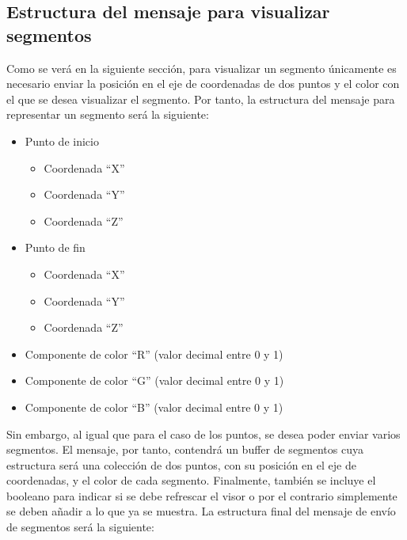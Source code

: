 \subsection{Estructura del mensaje para visualizar segmentos}
Como se verá en la siguiente sección, para visualizar un segmento únicamente es necesario enviar la posición en el eje de coordenadas de dos puntos y el color con el que se desea visualizar el segmento. Por tanto, la estructura del mensaje para representar un segmento será la siguiente:
\begin{itemize}
\item Punto de inicio
	\begin{itemize}
		\item Coordenada ``X''
		\item Coordenada ``Y''
		\item Coordenada ``Z''
	\end{itemize}
\item Punto de fin
	\begin{itemize}
		\item Coordenada ``X''
		\item Coordenada ``Y''
		\item Coordenada ``Z''
	\end{itemize}
\item Componente de color ``R'' (valor decimal entre 0 y 1)
\item Componente de color ``G'' (valor decimal entre 0 y 1)
\item Componente de color ``B'' (valor decimal entre 0 y 1)
\end{itemize}
Sin embargo, al igual que para el caso de los puntos, se desea poder enviar varios segmentos. El mensaje, por tanto, contendrá un buffer de segmentos cuya estructura será una colección de dos puntos, con su posición en el eje de coordenadas, y el color de cada segmento.
Finalmente, también se incluye el booleano para indicar si se debe refrescar el visor o por el contrario simplemente se deben añadir a lo que ya se muestra.
La estructura final del mensaje de envío de segmentos será la siguiente:
